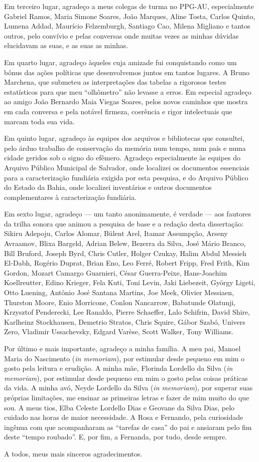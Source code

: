 \begin{agradecimentos}
Em terceiro lugar, agradeço a meus colegas de turma no PPG-AU, especialmente Gabriel Ramos, Maria Simone Soares, João Marques, Aline Tosta, Carlos Quinto, Lumena Addad, Maurício Felzemburgh, Santiago Cao, Milena Migliano e tantos outros, pelo convívio e pelas conversas onde muitas vezes as minhas dúvidas elucidavam as suas, e as suas as minhas.

Em quarto lugar, agradeço àqueles cuja amizade fui conquistando como um bônus das ações políticas que desenvolvemos juntos em tantos lugares. A Bruno Marchena, que submeteu as interpretações das tabelas a rigorosos testes estatísticos para que meu ``olhômetro'' não levasse a erros. Em especial agradeço ao amigo João Bernardo Maia Viegas Soares, pelos novos caminhos que mostra em cada conversa e pela notável firmeza, coerência e rigor intelectuais que marcam toda sua vida.

Em quinto lugar, agradeço às equipes dos arquivos e bibliotecas que consultei, pelo árduo trabalho de conservação da memória num tempo, num país e numa cidade geridos sob o signo do efêmero. Agradeço especialmente às equipes do Arquivo Público Municipal de Salvador, onde localizei os documentos essenciais para a caracterização fundiária exigida por esta pesquisa, e do Arquivo Público do Estado da Bahia, onde localizei inventários e outros documentos complementares à caracterização fundiária.

Em sexto lugar, agradeço --- um tanto anonimamente, é verdade --- aos fautores da trilha sonora que animou a pesquisa de base e a redação desta dissertação: Sikiru Adepoju, Carlos Alomar, Bülent Arel, Itamar Assumpção, Arseny Avraamov, Blixa Bargeld, Adrian Belew, Bezerra da Silva, José Mário Branco, Bill Bruford, Joseph Byrd, Chris Cutler, Holger Czukay, Halim Abdul Messieh El-Dabh, Rogério Duprat, Brian Eno, Leo Ferré, Robert Fripp, Fred Frith, Kim Gordon, Mozart Camargo Guarnieri, César Guerra-Peixe, Hans-Joachim Koellreutter, Edino Krieger, Fela Kuti, Toni Levin, Jaki Liebezeit, György Ligeti, Otto Luening, Antônio José Santana Martins, Joe Meek, Olivier Messiaen, Thurston Moore, Enio Morricone, Conlon Nancarrow, Babatunde Olatunji, Krzysztof Penderecki, Lee Ranaldo, Pierre Schaeffer, Lalo Schifrin, David Shire, Karlheinz Stockhausen, Demetrio Stratos, Chris Squire, Gábor Szabó, Univers Zero, Vladimir Ussachevsky, Edgard Varèse, Scott Walker, Tony Williams. 

Por último e mais importante, agradeço a minha família. A meu pai, Manoel Maria do Nascimento (\textit{in memoriam}), por estimular desde pequeno em mim o gosto pela leitura e erudição. A minha mãe, Florinda Lordello da Silva (\textit{in memoriam}), por estimular desde pequeno em mim o gosto pelas coisas práticas da vida. A minha avó, Neyde Lordello da Silva (\textit{in memoriam}), por superar suas próprias limitações, me ensinar as primeiras letras e fazer de mim muito do que sou. A meus tios, Elba Celeste Lordello Dias e Geovane da Silva Dias, pelo cuidado nas horas de maior necessidade. A Rosa e Fernando, pela curiosidade ingênua com que acompanharam as ``tarefas de casa'' do pai e ansiaram pelo fim deste ``tempo roubado''. E, por fim, a Fernanda, por tudo, desde sempre.

A todos, meus mais sinceros agradecimentos.

\end{agradecimentos}

